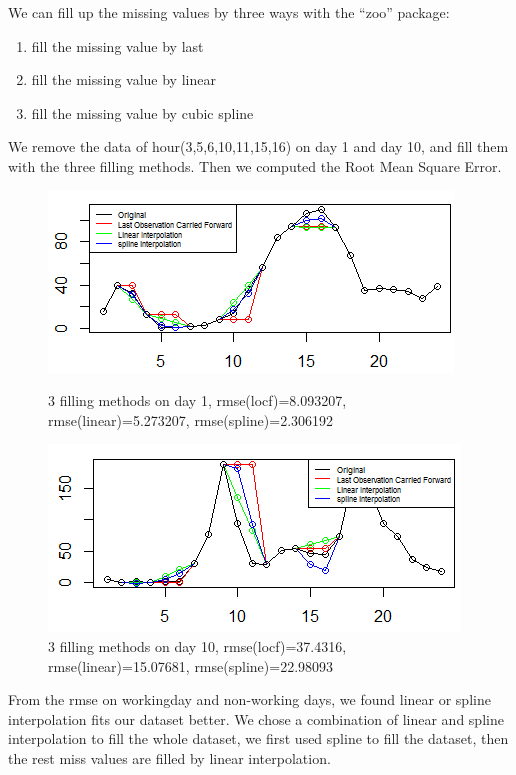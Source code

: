 \documentclass[12pt]{article}
\begin{document}
	We can fill up the missing values by three ways with the ``zoo'' package:
	\begin{enumerate}
		\item fill the missing value by last 
		
		\item fill the missing value by linear 
		
		\item fill the missing value by cubic spline	
	\end{enumerate}
	We remove the data of hour(3,5,6,10,11,15,16) on day 1 and day 10, and fill them with the three filling methods. Then we computed the Root Mean Square Error. 
	\begin{figure}[H]
		\centering
		\begin{minipage}{.45\textwidth}
			\centering
			\includegraphics[width=\linewidth]{figures/day1_missing_value.png}
			\caption{ 3 filling methods on day 1,  rmse(locf)=8.093207, rmse(linear)=5.273207, rmse(spline)=2.306192}
		\end{minipage}%
		\begin{minipage}{.42\textwidth}
			\centering
			\includegraphics[width=\linewidth]{figures/day10_missing_value.png}
			\caption{ 3 filling methods on day 10, rmse(locf)=37.4316, rmse(linear)=15.07681, rmse(spline)=22.98093}
			
		\end{minipage}
	\end{figure}
 From the rmse on workingday and non-working days, we found linear or spline interpolation fits our dataset better. We chose a combination of linear and spline interpolation to fill the whole dataset, we first used spline to fill the dataset, then the rest miss values are filled by linear interpolation.
\end{document}
